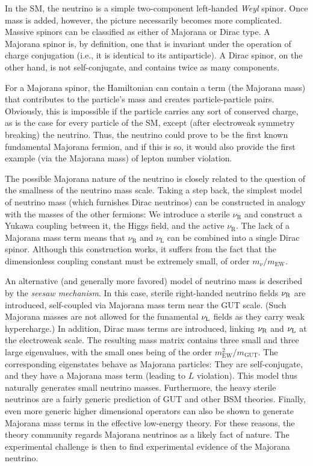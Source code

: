 \documentclass[../thesis.tex]{subfiles}
\begin{document}
In the SM, the neutrino is a simple two-component left-handed \emph{Weyl}
spinor. Once mass is added, however, the picture necessarily becomes more
complicated. Massive spinors can be classified as either of Majorana or Dirac
type. A Majorana spinor is, by definition, one that is invariant under the
operation of charge conjugation (i.e., it is identical to its antiparticle). A
Dirac spinor, on the other hand, is not self-conjugate, and contains twice as
many components.

For a Majorana spinor, the Hamiltonian can contain a term (the Majorana mass)
that contributes to the particle's mass and creates particle-particle
pairs. Obviously, this is impossible if the particle carries any sort of
conserved charge, as is the case for every particle of the SM, except (after
electroweak symmetry breaking) the neutrino. Thus, the neutrino could prove to
be the first known fundamental Majorana fermion, and if this is so, it would
also provide the first example (via the Majorana mass) of lepton number
violation.

The possible Majorana nature of the neutrino is closely related to the question
of the smallness of the neutrino mass scale. Taking a step back, the simplest
model of neutrino mass (which furnishes Dirac neutrinos) can be constructed in
analogy with the masses of the other fermions: We introduce a sterile
$\nu_{\text{R}}$ and construct a Yukawa coupling between it, the Higgs field,
and the active $\nu_{\text{R}}$. The lack of a Majorana mass term means that
$\nu_{\text{R}}$ and $\nu_{\text{L}}$ can be combined into a single Dirac
spinor. Although this construction works, it suffers from the fact that the
dimensionless coupling constant must be extremely small, of order
$m_\nu/m_{\text{EW}}$.

An alternative (and generally more favored) model of neutrino mass is described
by the \emph{seesaw mechanism}. In this case, sterile right-handed neutrino
fields $\nu_{\text{R}}$ are introduced, self-coupled via Majorana mass term near the GUT
scale. (Such Majorana masses are not allowed for the funamental $\nu_{\text{L}}$ fields as
they carry weak hypercharge.) In addition, Dirac mass terms are introduced,
linking $\nu_{\text{R}}$ and $\nu_{\text{L}}$ at the electroweak scale. The resulting mass matrix
contains three small and three large eigenvalues, with the small ones being of
the order \(m^2_{\text{EW}} / m_{\text{GUT}}\). The corresponding eigenstates
behave as Majorana particles: They are self-conjugate, and they have a Majorana
mass term (leading to $L$ violation). This model thus naturally generates small
neutrino masses. Furthermore, the heavy sterile neutrinos are a fairly generic
prediction of GUT and other BSM theories. Finally, even more generic higher
dimensional operators can also be shown to generate Majorana mass terms in the
effective low-energy theory. For these reasons, the theory community regards
Majorana neutrinos as a likely fact of nature. The experimental challenge is
then to find experimental evidence of the Majorana neutrino.
\end{document}
